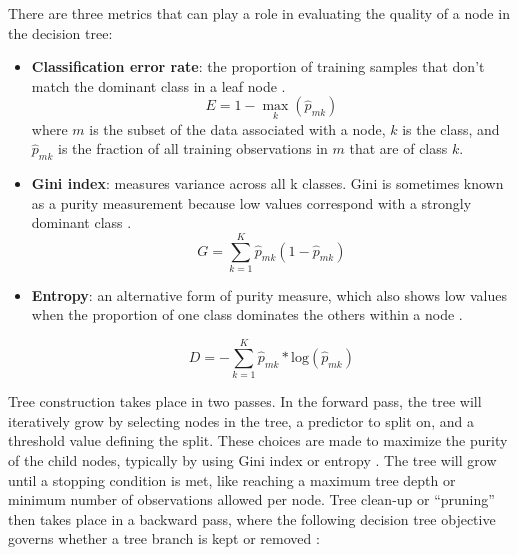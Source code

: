 There are three metrics that can play a role in evaluating the quality of a node in the decision tree:

\begin{itemize}[itemsep=2pt]\label{ch3:impurity}
    \item \textbf{Classification error rate}: the proportion of training samples that don't match the dominant class in a leaf node \citep[p. 312]{james_introduction_2013}.
    \begin{equation}
    \label{eq:error_rate}
        E = 1 - \max_k(\hat{p}_{mk})
    \end{equation}
    where $m$ is the subset of the data associated with a node, $k$ is the class, and $\hat{p}_{mk}$ is the fraction of all training observations in $m$ that are of class $k$. 
    \item \textbf{Gini index}: measures variance across all k classes. Gini is sometimes known as a purity measurement because low values correspond with a strongly dominant class \citep[p. 312]{james_introduction_2013}.
    \begin{equation}
    \label{eq:gini}
        G = \sum_{k=1}^{K}{\hat{p}_{mk}(1-\hat{p}_{mk})}
    \end{equation}
    \item \textbf{Entropy}: an alternative form of purity measure, which also shows low values when the proportion of one class dominates the others within a node \citep[p. 312]{james_introduction_2013}.
    
    \begin{equation}
    \label{eq:entropy}
        D = -\sum_{k=1}^{K}{\hat{p}_{mk}* \text{log}(\hat{p}_{mk})}
    \end{equation}
\end{itemize}

Tree construction takes place in two passes. In the forward pass, the tree will iteratively grow by selecting nodes in the tree, a predictor to split on, and a threshold value defining the split. These choices are made to maximize the purity of the child nodes, typically by using Gini index or entropy \citep[p. 307]{james_introduction_2013}. The tree will grow until a stopping condition is met, like reaching a maximum tree depth or minimum number of observations allowed per node. Tree clean-up or ``pruning'' then takes place in a backward pass, where the following decision tree objective governs whether a tree branch is kept or removed \citep[p. 309]{james_introduction_2013}:

